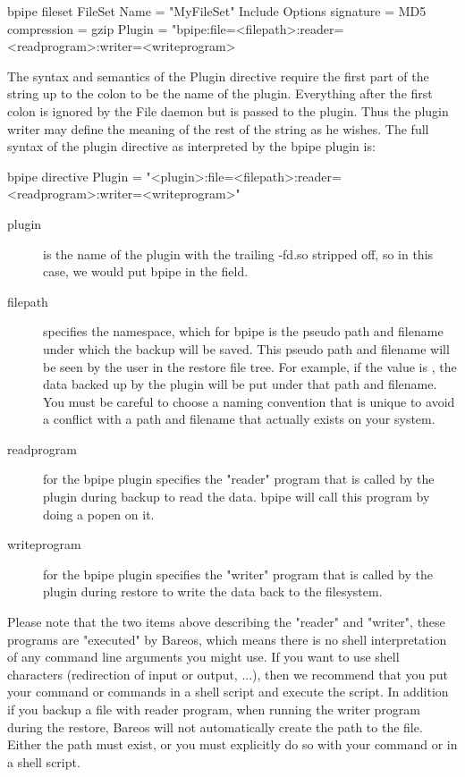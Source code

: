 \begin{bconfig}{bpipe fileset}
FileSet {
  Name = "MyFileSet"
  Include {
    Options {
      signature = MD5
      compression = gzip
    }
    Plugin = "bpipe:file=<filepath>:reader=<readprogram>:writer=<writeprogram>
  }
}
\end{bconfig}

The syntax and semantics of the Plugin directive require the first part of the string up to the colon to be the name of the plugin.
Everything after the first colon is ignored by the File daemon but is passed to the plugin. Thus the plugin writer may define the 
meaning of the rest of the string as he wishes. The full syntax of the plugin directive as interpreted by the bpipe plugin is:

\begin{bconfig}{bpipe directive}
Plugin = "<plugin>:file=<filepath>:reader=<readprogram>:writer=<writeprogram>"
\end{bconfig}

\begin{description}
\item[plugin] is the name of the plugin with the trailing -fd.so stripped off, so in this case, we would put bpipe in the field.

\item[filepath] specifies the namespace, which for bpipe is the pseudo path and filename under which the backup will be saved. This
pseudo path and filename will be seen by the user in the restore file tree. For example, if the value is ,
the data
backed up by the plugin will be put under that  path and filename.
You must be careful to choose a naming convention that is unique
to avoid a conflict with a path and filename that actually exists on your system.

\item[readprogram] for the bpipe plugin specifies the "reader" program that is called by the plugin during backup to read the data. bpipe
will call this program by doing a popen on it.

\item[writeprogram] for the bpipe plugin specifies the "writer" program that is called by the plugin during restore to write the data back 
to the filesystem.
\end{description}

Please note that the two items above describing the "reader" and "writer", these programs are "executed" by Bareos, which means 
there is no shell interpretation of any command line arguments you might use. If you want to use shell characters (redirection of input 
or output, ...), then we recommend that you put your command or commands in a shell script and execute the script. In addition if you
backup a file with reader program, when running the writer program during the restore, Bareos will not automatically create the path
to the file. Either the path must exist, or you must explicitly do so with your command or in a shell script.


